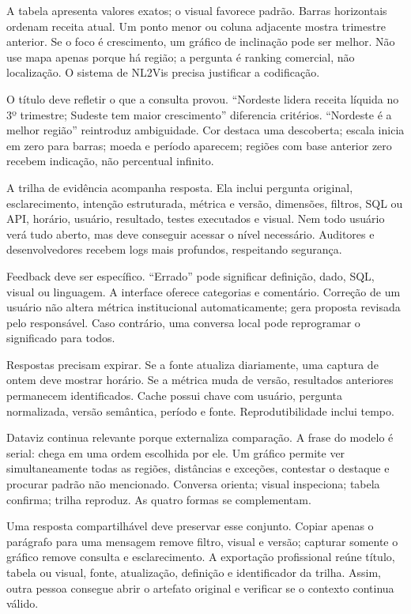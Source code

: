 A tabela apresenta valores exatos; o visual favorece padrão. Barras horizontais ordenam receita atual. Um ponto menor ou coluna adjacente mostra trimestre anterior. Se o foco é crescimento, um gráfico de inclinação pode ser melhor. Não use mapa apenas porque há região; a pergunta é ranking comercial, não localização. O sistema de NL2Vis precisa justificar a codificação.

O título deve refletir o que a consulta provou. ``Nordeste lidera receita líquida no 3º trimestre; Sudeste tem maior crescimento'' diferencia critérios. ``Nordeste é a melhor região'' reintroduz ambiguidade. Cor destaca uma descoberta; escala inicia em zero para barras; moeda e período aparecem; regiões com base anterior zero recebem indicação, não percentual infinito.

A trilha de evidência acompanha resposta. Ela inclui pergunta original, esclarecimento, intenção estruturada, métrica e versão, dimensões, filtros, SQL ou API, horário, usuário, resultado, testes executados e visual. Nem todo usuário verá tudo aberto, mas deve conseguir acessar o nível necessário. Auditores e desenvolvedores recebem logs mais profundos, respeitando segurança.

Feedback deve ser específico. ``Errado'' pode significar definição, dado, SQL, visual ou linguagem. A interface oferece categorias e comentário. Correção de um usuário não altera métrica institucional automaticamente; gera proposta revisada pelo responsável. Caso contrário, uma conversa local pode reprogramar o significado para todos.

Respostas precisam expirar. Se a fonte atualiza diariamente, uma captura de ontem deve mostrar horário. Se a métrica muda de versão, resultados anteriores permanecem identificados. Cache possui chave com usuário, pergunta normalizada, versão semântica, período e fonte. Reprodutibilidade inclui tempo.

Dataviz continua relevante porque externaliza comparação. A frase do modelo é serial: chega em uma ordem escolhida por ele. Um gráfico permite ver simultaneamente todas as regiões, distâncias e exceções, contestar o destaque e procurar padrão não mencionado. Conversa orienta; visual inspeciona; tabela confirma; trilha reproduz. As quatro formas se complementam.

Uma resposta compartilhável deve preservar esse conjunto. Copiar apenas o parágrafo para uma mensagem remove filtro, visual e versão; capturar somente o gráfico remove consulta e esclarecimento. A exportação profissional reúne título, tabela ou visual, fonte, atualização, definição e identificador da trilha. Assim, outra pessoa consegue abrir o artefato original e verificar se o contexto continua válido.

